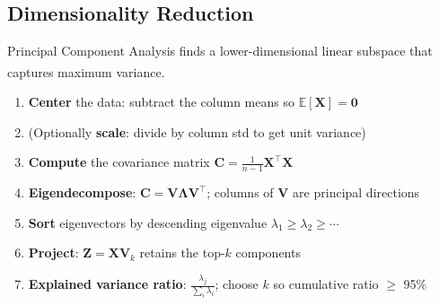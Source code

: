 \subsection{Dimensionality Reduction}

\begin{tcbitemize}[ skin=sectionraster ]
    \tcbitem[title={PCA Step-by-Step}, raster multicolumn=3]
    Principal Component Analysis finds a lower-dimensional linear subspace that captures maximum variance\textsuperscript{\cite{hastieElementsStatisticalLearning2008}}.
    \tcblower
    \begin{enumerate}
        \item \textbf{Center} the data: subtract the column means so $\mathbb{E}[\mathbf{X}] = \mathbf{0}$
        \item (Optionally \textbf{scale}: divide by column std to get unit variance)
        \item \textbf{Compute} the covariance matrix $\mathbf{C} = \frac{1}{n-1}\mathbf{X}^\top\mathbf{X}$
        \item \textbf{Eigendecompose}: $\mathbf{C} = \mathbf{V}\mathbf{\Lambda}\mathbf{V}^\top$; columns of $\mathbf{V}$ are principal directions
        \item \textbf{Sort} eigenvectors by descending eigenvalue $\lambda_1 \geq \lambda_2 \geq \cdots$
        \item \textbf{Project}: $\mathbf{Z} = \mathbf{X}\mathbf{V}_k$ retains the top-$k$ components
        \item \textbf{Explained variance ratio}: $\frac{\lambda_j}{\sum_i \lambda_i}$; choose $k$ so cumulative ratio $\geq$ 95\%
    \end{enumerate}


\end{tcbitemize}
